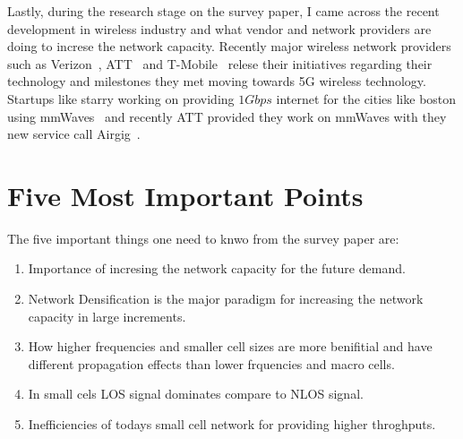 \documentclass[12pt,onecolumn]{IEEEtran}
\begin{document}
Lastly, during the research stage on the survey paper, I came across the recent development in wireless industry and what vendor and network providers are doing to increse the network capacity. Recently major wireless network providers such as Verizon~\cite{verizon5g}, ATT~\cite{att5g} and T-Mobile~\cite{tmobile5g} relese their initiatives regarding their technology and milestones they met moving towards 5G wireless technology. Startups like starry working on providing $1Gbps$ internet for the cities like boston using mmWaves~\cite{techinsider} and recently ATT provided they work on mmWaves with they new service call Airgig~\cite{att}.
\section{Five Most Important Points}
\label{sec:FMIP}

The five important things one need to knwo from the survey paper are:
\renewcommand{\labelenumi}{\arabic{enumi}}
\begin{enumerate}
   \item Importance of incresing the network capacity for the future demand.
   \item Network Densification is the major paradigm for increasing the network capacity in large increments.
   \item How higher frequencies and smaller cell sizes are more benifitial and have different propagation effects than lower frquencies and macro cells.
   \item In small cels LOS signal dominates compare to NLOS signal.
   \item Inefficiencies of todays small cell network for providing higher throghputs.
\end{enumerate}

\ifCLASSOPTIONcaptionsoff
  \newpage
\fi



\end{document}
